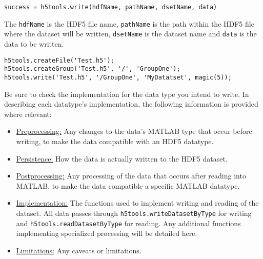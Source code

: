 \documentclass[11pt]{exam}
\newcommand\myfcn[1]{\colorbox{codegray}{\textcolor{codeblue}{\texttt{#1}}}}
\begin{document}
		\begin{lstlisting}[style=matlab-editor, basicstyle=\mlttfamily\footnotesize]
success = h5tools.write(hdfName, pathName, dsetName, data)
		\end{lstlisting}
		The \texttt{hdfName} is the HDF5 file name, \texttt{pathName} is the path within the HDF5 file where the dataset will be written, \texttt{dsetName} is the dataset name and \texttt{data} is the data to be written.
		\begin{lstlisting}[style=matlab-editor, basicstyle=\mlttfamily\footnotesize]
% Write a dataset named 'MyDatatset' to' GroupOne'
h5tools.createFile('Test.h5');
h5tools.createGroup('Test.h5', '/', 'GroupOne');
h5tools.write('Test.h5', '/GroupOne', 'MyDatatset', magic(5));
		\end{lstlisting}
		$\quad$\\
        \noindent Be sure to check the implementation for the data type you intend to write. In describing each datatype's implementation, the following information is provided where relevant:
        \begin{itemize}
            \item \underline{Preprocessing:} Any changes to the data's MATLAB type that occur before writing, to make the data compatible with an HDF5 datatype.
            \item \underline{Persistence:} How the data is actually written to the HDF5 dataset.
            \item \underline{Postprocessing:} Any processing of the data that occurs after reading into MATLAB, to make the data compatible a specific MATLAB datatype.
            \item \underline{Implementation:} The functions used to implement writing and reading of the dataset. All data passes through \myfcn{h5tools.writeDatasetByType} for writing and \myfcn{h5tools.readDatasetByType} for reading. Any additional functions implementing specialized processing will be detailed here. 
			\item \underline{Limitations:} Any caveats or limitations.
        \end{itemize}
\end{document}

